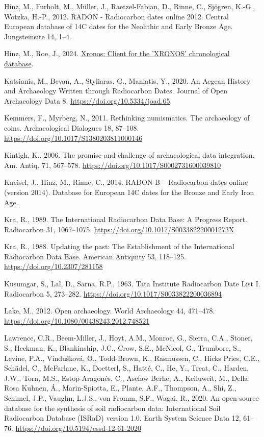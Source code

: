 \documentclass[
  number,
  doubleblind]{elsarticle}
\newlength{\cslhangindent}
\newenvironment{CSLReferences}[2] %
 {\begin{list}{}{%
  \setlength{\itemindent}{0pt}
  \setlength{\leftmargin}{0pt}
  \setlength{\parsep}{0pt}
  \ifodd #1
   \setlength{\leftmargin}{\cslhangindent}
   \setlength{\itemindent}{-1\cslhangindent}
  \fi
  \setlength{\itemsep}{#2\baselineskip}}}
 {\end{list}}
\begin{document}
\begin{CSLReferences}{1}{0}
Hinz, M., Furholt, M., Müller, J., Raetzel-Fabian, D., Rinne, C.,
Sjögren, K.-G., Wotzka, H.-P., 2012. {RADON} - {Radiocarbon} dates
online 2012. {Central European} database of {14C} dates for the
{Neolithic} and {Early Bronze Age}. Jungsteinsite 14, 1--4.

Hinz, M., Roe, J., 2024.
\href{https://github.com/xronos-ch/xronos.R}{Xronos: Client for the
'XRONOS' chronological database}.

Katsianis, M., Bevan, A., Styliaras, G., Maniatis, Y., 2020. An {Aegean
History} and {Archaeology Written} through {Radiocarbon Dates}. Journal
of Open Archaeology Data 8. \url{https://doi.org/10.5334/joad.65}

Kemmers, F., Myrberg, N., 2011. Rethinking numismatics. {The}
archaeology of coins. Archaeological Dialogues 18, 87--108.
\url{https://doi.org/10.1017/S1380203811000146}

Kintigh, K., 2006. The promise and challenge of archaeological data
integration. Am. Antiq. 71, 567--578.
\url{https://doi.org/10.1017/S0002731600039810}

Kneisel, J., Hinz, M., Rinne, C., 2014. {RADON-B} -- {Radiocarbon} dates
online (version 2014). {Database} for {European 14C} dates for the
{Bronze} and {Early Iron Age}.

Kra, R., 1989. The {International Radiocarbon Data Base}: {A Progress
Report}. Radiocarbon 31, 1067--1075.
\url{https://doi.org/10.1017/S003382220001273X}

Kra, R., 1988. Updating the past: {The Establishment} of the
{International Radiocarbon Data Base}. American Antiquity 53, 118--125.
\url{https://doi.org/10.2307/281158}

Kusumgar, S., Lal, D., Sarna, R.P., 1963. Tata {Institute Radiocarbon
Date List I}. Radiocarbon 5, 273--282.
\url{https://doi.org/10.1017/S0033822200036894}

Lake, M., 2012. Open archaeology. World Archaeology 44, 471--478.
\url{https://doi.org/10.1080/00438243.2012.748521}

Lawrence, C.R., Beem-Miller, J., Hoyt, A.M., Monroe, G., Sierra, C.A.,
Stoner, S., Heckman, K., Blankinship, J.C., Crow, S.E., McNicol, G.,
Trumbore, S., Levine, P.A., Vindušková, O., Todd-Brown, K., Rasmussen,
C., Hicks Pries, C.E., Schädel, C., McFarlane, K., Doetterl, S., Hatté,
C., He, Y., Treat, C., Harden, J.W., Torn, M.S., Estop-Aragonés, C.,
Asefaw Berhe, A., Keiluweit, M., Della Rosa Kuhnen, Á., Marin-Spiotta,
E., Plante, A.F., Thompson, A., Shi, Z., Schimel, J.P., Vaughn, L.J.S.,
von Fromm, S.F., Wagai, R., 2020. An open-source database for the
synthesis of soil radiocarbon data: {International Soil Radiocarbon
Database} ({ISRaD}) version 1.0. Earth System Science Data 12, 61--76.
\url{https://doi.org/10.5194/essd-12-61-2020}


\end{CSLReferences}
\end{document}
